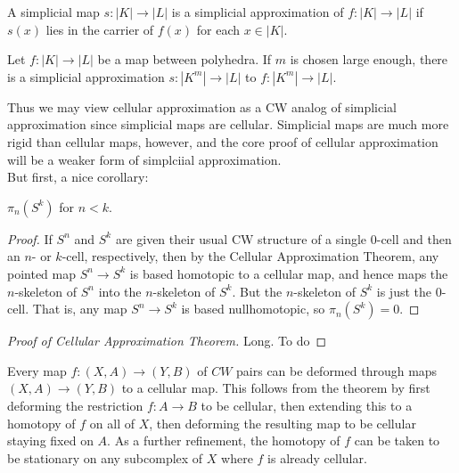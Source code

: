 \begin{definition}
    A simplicial map $s \colon \left| K \right| 
    \to \left| L \right| $ is a simplicial approximation of 
    $f \colon \left| K \right|  \to \left| L \right| $ 
    if $s(x)$ lies in the carrier of $f(x)$ for
    each $x \in \left| K \right| $.
\end{definition}

\begin{theorem}
    Let $f \colon \left| K \right| \to 
    \left| L \right| $ be a map between polyhedra.
    If $m$ is chosen large enough, there is a simplicial
    approximation $s \colon \left| K^{m} \right| \to 
    \left| L \right| $ to $f \colon \left| K^{m} \right| 
    \to \left| L \right| $.
\end{theorem}

Thus we may view cellular approximation as
a CW analog of simplicial approximation since simplicial
maps are cellular. Simplicial maps are much more rigid
than cellular maps, however, and the core
proof of cellular approximation will be
a weaker form of simplciial approximation.\\
\linebreak
But first, a nice corollary:

\begin{corollary}
    $\pi_n \left( S^{k} \right) $ for
    $n<k$.
\end{corollary}

\begin{proof}
    If $S^{n}$ and $S^{k}$ are given their usual
    CW structure of a single $0$-cell and
    then an $n$- or $k$-cell, respectively, then by
    the Cellular Approximation Theorem, 
    any pointed map $S^{n} \to S^{k}$ is based homotopic to a 
    cellular map, and hence maps
    the  $n$-skeleton of $S^{n}$ into the $n$-skeleton
    of $S^{k}$. But the $n$-skeleton of $S^{k}$ is
    just the $0$-cell. That is, 
    any map $S^{n} \to S^{k}$ is based nullhomotopic, so
    $\pi_n \left( S^{k} \right) = 0$.
\end{proof}

\begin{proof}[Proof of Cellular Approximation Theorem]
    Long. To do
\end{proof}

\begin{example}
    Every map $f \colon \left( X,A \right) 
    \to \left( Y,B \right) $ of $CW$ pairs can be deformed
    through maps $\left( X,A \right) \to 
    \left( Y,B \right) $ to a cellular map.
    This follows from the theorem by first deforming the
    restriction $f \colon A\to B$ to be cellular,
    then extending this to a homotopy of $f$ on all
    of $X$, then deforming the resulting map
    to be cellular staying fixed on $A$. As a further
    refinement, the homotopy of $f$ can be
    taken to be stationary on any subcomplex of
    $X$ where $f$ is already cellular.
\end{example}


